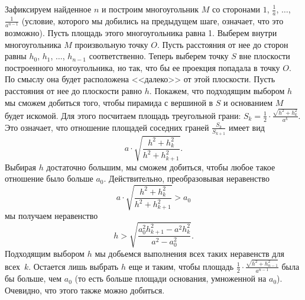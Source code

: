 Зафиксируем найденное $n$ и построим многоугольник $M$ со сторонами $1$,
$\frac{1}{a}$, $\ldots$, $\frac{1}{a^{n-1}}$
(условие, которого мы добились на предыдущем шаге, означает, что это возможно).
Пусть площадь этого многоугольника равна 1.
Выберем внутри многоугольника $M$ произвольную точку $O$.
Пусть расстояния от нее до сторон равны $h_0$, $h_1$, $\ldots$, $h_{n-1}$
соответственно.
Теперь выберем точку $S$ вне плоскости построенного многоугольника, но так, что
бы ее проекция попадала в точку $O$.
По смыслу она будет расположена <<далеко>> от этой плоскости.
Пусть расстояния от нее до плоскости равно $h$.
Покажем, что подходящим выбором $h$ мы сможем добиться того, чтобы пирамида с
вершиной в $S$ и основанием $M$ будет искомой.
Для этого посчитаем площадь треугольной грани:
$S_k = \frac{1}{2} \cdot \frac{\sqrt{h^2 + h_k^2}}{a^k}$.
Это означает, что отношение площадей соседних граней $\frac{S_k}{S_{k+1}}$
имеет вид 
\[
    a \cdot \sqrt{\frac{h^2 + h_k^2}{h^2 + h_{k+1}^2}}.
\] 
Выбирая $h$ достаточно большим, мы сможем добиться, чтобы любое такое
отношение было больше $a_0$.
Действительно, преобразовывая неравенство
\[
    a \cdot \sqrt{\frac{h^2 + h_k^2}{h^2 + h_{k+1}^2}}
>
    a_0
\]
мы получаем неравенство 
\[
    h
>
    \sqrt{\frac{a_0^2h_{k+1}^2-a^2h_k^2}{a^2-a_0^2}}
.\]
Подходящим выбором $h$ мы добьемся выполнения всех таких неравенств для
всех~$k$.
Остается лишь выбрать $h$ еще и таким, чтобы площадь
$\frac{1}{2} \cdot \frac{\sqrt{h^2+h_{n-1}^2}}{a^{n-1}}$ была бы больше, чем
$a_0$ (то есть больше площади основания, умноженной на $a_0$).
Очевидно, что этого также можно добиться.
\endproblem
